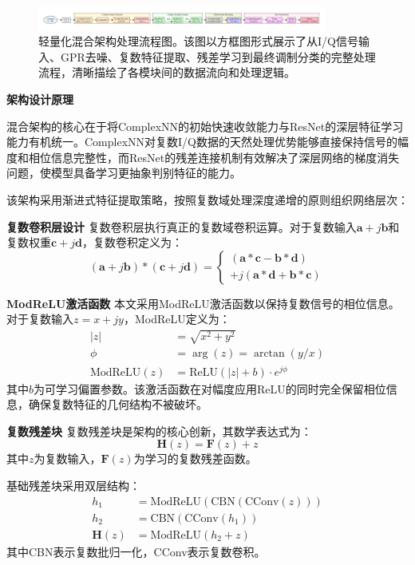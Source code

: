 \documentclass[conference]{IEEEtran}
\begin{document}
\begin{figure}[htbp]
\centering
\includegraphics[width=0.85\textwidth]{figure/lightweight_hybrid_model.pdf}
\caption{轻量化混合架构处理流程图。该图以方框图形式展示了从I/Q信号输入、GPR去噪、复数特征提取、残差学习到最终调制分类的完整处理流程，清晰描绘了各模块间的数据流向和处理逻辑。}
\label{fig:lightweight_hybrid_model_flow}
\end{figure}

\textbf{架构设计原理}

混合架构的核心在于将ComplexNN的初始快速收敛能力与ResNet的深层特征学习能力有机统一。ComplexNN对复数I/Q数据的天然处理优势能够直接保持信号的幅度和相位信息完整性，而ResNet的残差连接机制有效解决了深层网络的梯度消失问题，使模型具备学习更抽象判别特征的能力。

该架构采用渐进式特征提取策略，按照复数域处理深度递增的原则组织网络层次：

\textbf{复数卷积层设计} 复数卷积层执行真正的复数域卷积运算。对于复数输入$\mathbf{a} + j\mathbf{b}$和复数权重$\mathbf{c} + j\mathbf{d}$，复数卷积定义为：
\begin{equation}
(\mathbf{a} + j\mathbf{b}) * (\mathbf{c} + j\mathbf{d}) = 
\begin{cases}
(\mathbf{a} * \mathbf{c} - \mathbf{b} * \mathbf{d}) \\
+ j(\mathbf{a} * \mathbf{d} + \mathbf{b} * \mathbf{c})
\end{cases}
\end{equation}

\textbf{ModReLU激活函数} 本文采用ModReLU激活函数以保持复数信号的相位信息。对于复数输入$z = x + jy$，ModReLU定义为：
\begin{align}
|z| &= \sqrt{x^2 + y^2} \\
\phi &= \arg(z) = \arctan(y/x) \\
\text{ModReLU}(z) &= \text{ReLU}(|z| + b) \cdot e^{j\phi}
\end{align}
其中$b$为可学习偏置参数。该激活函数在对幅度应用ReLU的同时完全保留相位信息，确保复数特征的几何结构不被破坏。

\textbf{复数残差块} 复数残差块是架构的核心创新，其数学表达式为：
\begin{equation}
\mathbf{H}(z) = \mathbf{F}(z) + z
\end{equation}
其中$z$为复数输入，$\mathbf{F}(z)$为学习的复数残差函数。

基础残差块采用双层结构：
\begin{align}
h_1 &= \text{ModReLU}(\text{CBN}(\text{CConv}(z))) \\
h_2 &= \text{CBN}(\text{CConv}(h_1)) \\
\mathbf{H}(z) &= \text{ModReLU}(h_2 + z)
\end{align}
其中CBN表示复数批归一化，CConv表示复数卷积。
\end{document}
